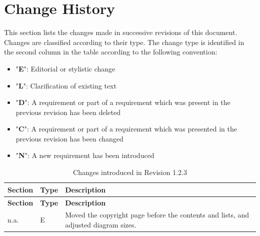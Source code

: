 \documentclass[requirements]{../fwprofile}
\begin{document}
\fwmaketitle
\begin{abstract}
This document defines, justifies, and verifies the User Requirements for the C1 Implementation of the FW Profile. The FW Profile is a specification-level modelling 
language defined as a restriction of UML. The core modelling constructs offered by the FW Profile are State Machines, Procedures (equivalent to UML's Activity Diagrams), and RT Containers (encapsulations of threads).
\par
The FW Profile is implementation-independent. The C1 Implementation is a C language implementation of the modelling concepts of the FW Profile. The main features of the C1 Implementation are: small memory footprint, small CPU demands, scalability, and
high reliability.
\par 
The C1 Implementation is provided with a Qualification Data Package which can be used to support the certification of applications built using its components.
\end{abstract}
\fwfrontmatter


\section{Change History}

This section lists the changes made in successive revisions of this document. Changes are classified according to their type. The change type is identified in the second column in the table according to the following convention:

\begin{itemize}[itemsep=0mm]
\item "\textbf{E}": Editorial or stylistic change
\item "\textbf{L}": Clarification of existing text
\item "\textbf{D}": A requirement or part of a requirement which was present in the previous revision has been deleted
\item "\textbf{C}": A requirement or part of a requirement which was presented in the previous revision has been changed
\item "\textbf{N}": A new requirement has been introduced
\end{itemize}

\begin{longtable}{|p{1.5cm}|p{1cm}|p{8cm}|}
\caption{Changes introduced in Revision 1.2.3} \\
\hline
\rowcolor{light-gray}
\textbf{Section} & \textbf{Type} & \textbf{Description} \\
\hline\hline
\endfirsthead
\rowcolor{light-gray}
\textbf{Section} & \textbf{Type} & \textbf{Description} \\
\hline\hline
\endhead
n.a. & E & Moved the copyright page before the contents and lists, and adjusted diagram sizes.\\
\hline
\end{longtable}
\end{document}
